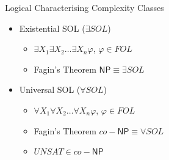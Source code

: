 \documentclass[usenames,dvipsnames]{beamer}
\newcommand{\NP}{\mathsf{NP}}
\begin{document}
\begin{frame}{Logical Characterising Complexity Classes}
    \begin{itemize}
        \item Existential SOL ($\exists SOL$)
        \begin{itemize}
            \item $\exists X_1\exists X_2\ldots\exists X_n\varphi$, $\varphi\in FOL$
            \item[]
            \begin{block}{Fagin's Theorem}
                $\NP\equiv \exists SOL$
            \end{block}
        \end{itemize}

        \item Universal SOL ($\forall SOL$)
        \begin{itemize}
            \item $\forall X_1\forall X_2\ldots\forall X_n\varphi$, $\varphi\in FOL$
            \item[]
            \begin{block}{Fagin's Theorem}
                $co-\NP\equiv \forall SOL$
            \end{block}

            \item $UNSAT\in co-\NP$
        \end{itemize}
    \end{itemize}
\end{frame}
\end{document}
